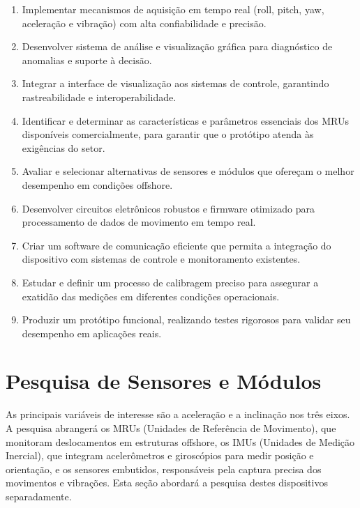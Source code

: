 \documentclass[a4paper, 12pt]{article}
\begin{document}
    \begin{enumerate}
        \item Implementar mecanismos de aquisição em tempo real (roll, pitch, yaw, aceleração e vibração) com alta confiabilidade e precisão.
        
        \item Desenvolver sistema de análise e visualização gráfica para diagnóstico de anomalias e suporte à decisão.
        
        \item Integrar a interface de visualização aos sistemas de controle, garantindo rastreabilidade e interoperabilidade.
    
        \item Identificar e determinar as características e parâmetros essenciais dos MRUs disponíveis comercialmente, para garantir que o protótipo atenda às exigências do setor.
        
        \item Avaliar e selecionar alternativas de sensores e módulos que ofereçam o melhor desempenho em condições offshore.
        
        \item Desenvolver circuitos eletrônicos robustos e firmware otimizado para processamento de dados de movimento em tempo real.
        
        \item Criar um software de comunicação eficiente que permita a integração do dispositivo com sistemas de controle e monitoramento existentes.
        
        \item Estudar e definir um processo de calibragem preciso para assegurar a exatidão das medições em diferentes condições operacionais.
        
        \item Produzir um protótipo funcional, realizando testes rigorosos para validar seu desempenho em aplicações reais. 
    \end{enumerate}

\newpage
\section{Pesquisa de Sensores e Módulos}
    As principais variáveis de interesse são a aceleração e a inclinação nos três eixos. A pesquisa abrangerá os MRUs (Unidades de Referência de Movimento), que monitoram deslocamentos em estruturas offshore, os IMUs (Unidades de Medição Inercial), que integram acelerômetros e giroscópios para medir posição e orientação, e os sensores embutidos, responsáveis pela captura precisa dos movimentos e vibrações. Esta seção abordará a pesquisa destes dispositivos separadamente.
\end{document}
